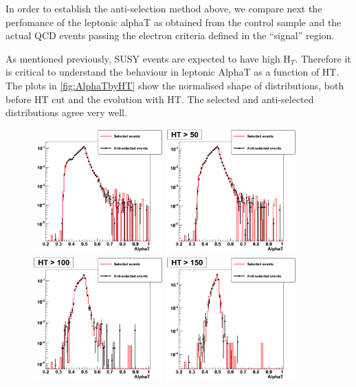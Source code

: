\documentclass{article}
\begin{document}
In order to establish the anti-selection method above, we compare next the perfomance of the leptonic alphaT as obtained from the control sample and the actual QCD events passing the electron criteria defined in the ``signal'' region.

As mentioned previously, SUSY events are expected to have high H$_{T}$. Therefore it is critical to understand the behaviour in leptonic AlphaT as a function of HT. The plots in \ref{fig:AlphaTbyHT} show the normalised shape of distributions, both before HT cut and the evolution with HT. The selected and anti-selected distributions agree very well.
\begin{figure}[h!]

\includegraphics[width=50mm]{alphat_1.png}
\includegraphics[width=50mm]{alphat_2.png}
\includegraphics[width=50mm]{alphat_3.png}
\includegraphics[width=50mm]{alphat_4.png}

\end{figure}
\end{document}
